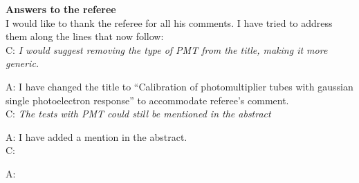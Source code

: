 \documentclass[a4paper,11pt]{article}
\begin{document}
{\bf Answers to the referee}
\\[1ex]

I would like to thank the referee for all his comments. 
I have tried to address them along the lines that now follow:
\\[1ex]

C: \emph{ I would suggest removing the type of PMT from the title, making it more generic. } 
	
A: I have changed the title to ``Calibration of photomultiplier tubes with gaussian single photoelectron response'' to accommodate referee's comment.
\\[1ex]

C: \emph{The tests with PMT could still be mentioned in the abstract} 

A: I have added a mention in the abstract.
\\[1ex]

C: \emph{ }
	
A: 
\\[1ex]
\end{document}
